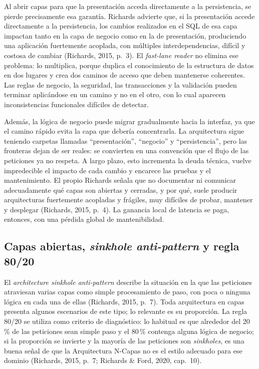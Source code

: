 \documentclass[12pt,a4paper]{article}
\begin{document}
Al abrir capas para que la presentación acceda directamente a la persistencia, se pierde precisamente esa garantía. Richards advierte que, si la presentación accede directamente a la persistencia, los cambios realizados en el SQL de esa capa impactan tanto en la capa de negocio como en la de presentación, produciendo una aplicación fuertemente acoplada, con múltiples interdependencias, difícil y costosa de cambiar (Richards, 2015, p.~3). El \emph{fast-lane reader} no elimina ese problema: lo multiplica, porque duplica el conocimiento de la estructura de datos en dos lugares y crea dos caminos de acceso que deben mantenerse coherentes. Las reglas de negocio, la seguridad, las transacciones y la validación pueden terminar aplicándose en un camino y no en el otro, con lo cual aparecen inconsistencias funcionales difíciles de detectar.

Además, la lógica de negocio puede migrar gradualmente hacia la interfaz, ya que el camino rápido evita la capa que debería concentrarla. La arquitectura sigue teniendo carpetas llamadas ``presentación'', ``negocio'' y ``persistencia'', pero las fronteras dejan de ser reales: se convierten en una convención que el flujo de las peticiones ya no respeta. A largo plazo, esto incrementa la deuda técnica, vuelve impredecible el impacto de cada cambio y encarece las pruebas y el mantenimiento. El propio Richards señala que no documentar ni comunicar adecuadamente qué capas son abiertas y cerradas, y por qué, suele producir arquitecturas fuertemente acopladas y frágiles, muy difíciles de probar, mantener y desplegar (Richards, 2015, p.~4). La ganancia local de latencia se paga, entonces, con una pérdida global de mantenibilidad.

\subsection{Capas abiertas, \emph{sinkhole anti-pattern} y regla 80/20}

El \emph{architecture sinkhole anti-pattern} describe la situación en la que las peticiones atraviesan varias capas como simple procesamiento de paso, con poca o ninguna lógica en cada una de ellas (Richards, 2015, p.~7). Toda arquitectura en capas presenta algunos escenarios de este tipo; lo relevante es su proporción. La regla 80/20 se utiliza como criterio de diagnóstico: lo habitual es que alrededor del 20\,\% de las peticiones sean simple paso y el 80\,\% contenga alguna lógica de negocio; si la proporción se invierte y la mayoría de las peticiones son \emph{sinkholes}, es una buena señal de que la Arquitectura N-Capas no es el estilo adecuado para ese dominio (Richards, 2015, p.~7; Richards \& Ford, 2020, cap.~10).
\end{document}
